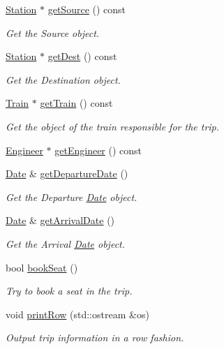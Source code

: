 \begin{DoxyCompactItemize}
\mbox{\hyperlink{classStation}{Station}} $\ast$ \mbox{\hyperlink{classTrip_a65b45d4816c85d47ef743e7c1cfe807f}{get\+Source}} () const
\begin{DoxyCompactList}\small\item\em Get the Source object. \end{DoxyCompactList}\item 
\mbox{\hyperlink{classStation}{Station}} $\ast$ \mbox{\hyperlink{classTrip_a459ae85fc25404ba616fabfb4b4165f4}{get\+Dest}} () const
\begin{DoxyCompactList}\small\item\em Get the Destination object. \end{DoxyCompactList}\item 
\mbox{\hyperlink{classTrain}{Train}} $\ast$ \mbox{\hyperlink{classTrip_a7595a39e9aa91e321d37b1696da50024}{get\+Train}} () const
\begin{DoxyCompactList}\small\item\em Get the object of the train responsible for the trip. \end{DoxyCompactList}\item 
\mbox{\hyperlink{classEngineer}{Engineer}} $\ast$ \mbox{\hyperlink{classTrip_ae499f5d9d3c72fecfac96c4a46cb5d28}{get\+Engineer}} () const
\item 
\mbox{\hyperlink{classDate}{Date}} \& \mbox{\hyperlink{classTrip_ae7c3b34b692a17737a2b1200060fa479}{get\+Departure\+Date}} ()
\begin{DoxyCompactList}\small\item\em Get the Departure \mbox{\hyperlink{classDate}{Date}} object. \end{DoxyCompactList}\item 
\mbox{\hyperlink{classDate}{Date}} \& \mbox{\hyperlink{classTrip_a821dfd23e37c28f1c0a2dab3f2836799}{get\+Arrival\+Date}} ()
\begin{DoxyCompactList}\small\item\em Get the Arrival \mbox{\hyperlink{classDate}{Date}} object. \end{DoxyCompactList}\item 
bool \mbox{\hyperlink{classTrip_a00e2b65d40562051bfe4124f581a49e1}{book\+Seat}} ()
\begin{DoxyCompactList}\small\item\em Try to book a seat in the trip. \end{DoxyCompactList}\item 
void \mbox{\hyperlink{classTrip_a233bab5c803f51ee5e79c611a15699c0}{print\+Row}} (std\+::ostream \&os)
\begin{DoxyCompactList}\small\item\em Output trip information in a row fashion. \end{DoxyCompactList}\end{DoxyCompactItemize}
